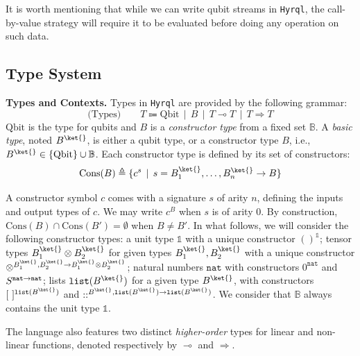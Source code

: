 \documentclass[10pt,a4paper]{article}
\newcommand{\bvar}{B}
\newcommand\bkvar{\bvar^{\ket{}}}
\newcommand{\qbit}{\mathrm{Qbit}}
\newcommand{\nonlinfunc}{\Rightarrow}
\newcommand{\linfunc}{\multimap}
\newcommand{\bset}{\mathbb{B}}
\newcommand{\unit}{\mathbb 1}
\newcommand{\nat}{\mathtt{nat}}
\newcommand{\typelist}[1]{\mathtt{list}(#1)}
\newcommand{\cons}[1]{\mathrm{Cons}(#1)}
\newcommand{\sign}[2]{\ifx&#1&
  \else
  #1 \to
  \fi
#2}
\newcommand{\signdefault}{\sign {\bkvar_1, \dots, \bkvar_n} \bvar}
\newcommand{\vunit}{()}
\newcommand{\nil}{[~]}
\newcommand{\gmid}{\,\mid\,}
\newcommand{\hyrql}{{{\tt{Hyrql}}}}
\begin{document}
It is worth mentioning that while we can write qubit streams in \hyrql{}, the
call-by-value strategy will require it to be evaluated before doing any
operation on such data.

\subsection{Type System}
\label{subsec:types}

\textbf{Types and Contexts. }
Types in \hyrql{} are provided by the following grammar:
\[
  \text{(Types)} \qquad T \Coloneqq \qbit \gmid B \gmid T \linfunc T
  \gmid T \nonlinfunc T
\]
$\qbit$ is the type for qubits and $\bvar$ is a \emph{constructor
type} from a fixed set $\bset$.
A \emph{basic type}, noted $\bkvar$, is either a qubit type, or a
constructor type $\bvar$, i.e., $\bkvar \in \{\qbit\} \cup \bset$.
Each constructor type is defined by its set of constructors:
\[
  \cons B \triangleq \{c^s \gmid s = \signdefault\}
\]

A constructor symbol $c$ comes with a signature $s$ of arity $n$, defining the
inputs and output types of $c$. We may write $c^\bvar$ when $s$ is of arity
$0$. By construction, $\cons B \cap \cons{B'} = \emptyset$ when $B \neq B'$.
In what follows, we will consider the
following constructor types: a unit type $\unit$ with a unique constructor
$\vunit^\unit$; tensor types $\bkvar_1 \otimes \bkvar_2$ for given
types $\bkvar_1, \bkvar_2$ with a unique constructor
$\otimes^{\sign{\bkvar_1, \bkvar_2}{\bkvar_1 \otimes \bkvar_2}}$;
natural numbers $\nat$ with constructors $0^\nat$ and 
$S^{\sign \nat \nat}$; lists $\typelist \bkvar$ for a given type $\bkvar$,
with constructors $\nil^{\typelist \bkvar}$ and $::^{\sign {\bkvar, \typelist
\bkvar} {\typelist \bkvar}}$. We consider that $\bset$ always contains the unit
type $\unit$.

The language also features two distinct \emph{higher-order} types
for linear and non-linear functions, denoted respectively
by $\linfunc$ and $\nonlinfunc$.
\end{document}
